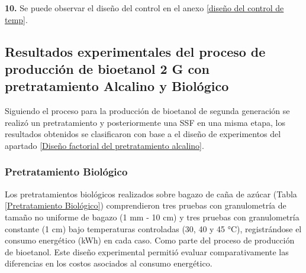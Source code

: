 \documentclass[12pt]{article}
\begin{document}
	     	
	     	\textbf{10.} Se puede observar el diseño del control en el anexo \ref{diseño del control de temp}.
	     	
	     	
			
			
		

				\subsection{Resultados experimentales del proceso de producción de bioetanol 2 G con pretratamiento Alcalino  y Biológico}
				Siguiendo el proceso para la producción de bioetanol de segunda generación se realizó un pretratamiento y posteriormente una SSF en una misma etapa, los resultados obtenidos se clasificaron con base a el diseño de experimentos del apartado \ref{Diseño factorial del pretratamiento alcalino}.
				
				
				
		
		\subsubsection{Pretratamiento Biológico}
	Los pretratamientos biológicos realizados sobre bagazo de caña de azúcar (Tabla \ref{Pretratamiento Biológico}) comprendieron tres pruebas con granulometría de tamaño no uniforme de bagazo (1 mm - 10 cm) y tres pruebas con granulometría constante (1 cm) bajo temperaturas controladas (30, 40 y 45 °C), registrándose el consumo energético (kWh) en cada caso. Como parte del proceso de producción de bioetanol.  Este diseño experimental permitió evaluar comparativamente las diferencias en los costos asociados al consumo energético. 
		
\end{document}
